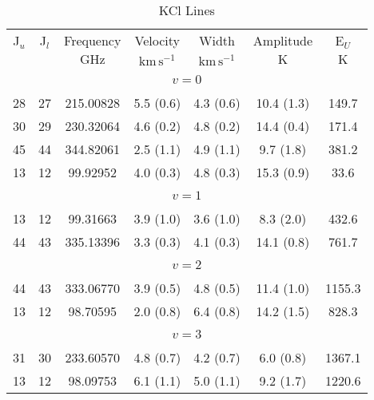 \begin{table*}[htp]
\centering
\caption{KCl Lines}
\begin{tabular}{ccccccc}
\label{tab:KCl_salt_lines}
 J$_u$ & J$_l$ & Frequency & Velocity & Width & Amplitude & E$_U$ \\
  &  & $\mathrm{GHz}$ & $\mathrm{km\,s^{-1}}$ & $\mathrm{km\,s^{-1}}$ & $\mathrm{K}$ & $\mathrm{K}$ \\
\hline
&\vspace{-0.75em}\\
\multicolumn{7}{c}{$v = 0$} \\
\vspace{-0.75em}\\
 28 & 27 & 215.00828 & 5.5 (0.6) & 4.3 (0.6) & 10.4 (1.3) & 149.7 \\
 30 & 29 & 230.32064 & 4.6 (0.2) & 4.8 (0.2) & 14.4 (0.4) & 171.4 \\
 45 & 44 & 344.82061 & 2.5 (1.1) & 4.9 (1.1) & 9.7 (1.8) & 381.2 \\
 13 & 12 & 99.92952 & 4.0 (0.3) & 4.8 (0.3) & 15.3 (0.9) & 33.6 \\
&\vspace{-0.75em}\\
\multicolumn{7}{c}{$v = 1$} \\
\vspace{-0.75em}\\
 13 & 12 & 99.31663 & 3.9 (1.0) & 3.6 (1.0) & 8.3 (2.0) & 432.6 \\
 44 & 43 & 335.13396 & 3.3 (0.3) & 4.1 (0.3) & 14.1 (0.8) & 761.7 \\
&\vspace{-0.75em}\\
\multicolumn{7}{c}{$v = 2$} \\
\vspace{-0.75em}\\
 44 & 43 & 333.06770 & 3.9 (0.5) & 4.8 (0.5) & 11.4 (1.0) & 1155.3 \\
 13 & 12 & 98.70595 & 2.0 (0.8) & 6.4 (0.8) & 14.2 (1.5) & 828.3 \\
&\vspace{-0.75em}\\
\multicolumn{7}{c}{$v = 3$} \\
\vspace{-0.75em}\\
 31 & 30 & 233.60570 & 4.8 (0.7) & 4.2 (0.7) & 6.0 (0.8) & 1367.1 \\
 13 & 12 & 98.09753 & 6.1 (1.1) & 5.0 (1.1) & 9.2 (1.7) & 1220.6 \\

\end{tabular}
\end{table*}
